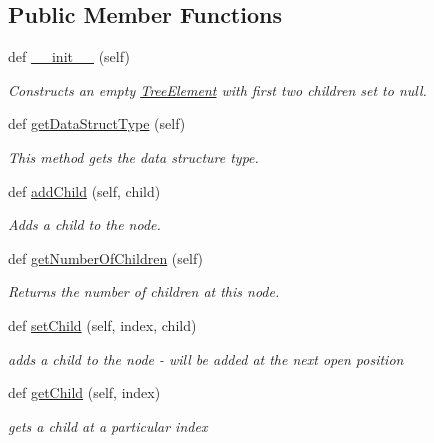 \subsection*{Public Member Functions}
\begin{DoxyCompactItemize}
\item 
def \hyperlink{class_tree_element_1_1_tree_element_ab58d73eaa251245c300b2ef98f6df82e}{\+\_\+\+\_\+init\+\_\+\+\_\+} (self)
\begin{DoxyCompactList}\small\item\em Constructs an empty \hyperlink{class_tree_element_1_1_tree_element}{Tree\+Element} with first two children set to null. \end{DoxyCompactList}\item 
def \hyperlink{class_tree_element_1_1_tree_element_a8df62ace8d1ba7131fe348a87bfd1d28}{get\+Data\+Struct\+Type} (self)
\begin{DoxyCompactList}\small\item\em This method gets the data structure type. \end{DoxyCompactList}\item 
def \hyperlink{class_tree_element_1_1_tree_element_ae5e92bcded51f4931c2f5c47d44ff26c}{add\+Child} (self, child)
\begin{DoxyCompactList}\small\item\em Adds a child to the node. \end{DoxyCompactList}\item 
def \hyperlink{class_tree_element_1_1_tree_element_a927788740a1a6ada175c22cf11d20e6b}{get\+Number\+Of\+Children} (self)
\begin{DoxyCompactList}\small\item\em Returns the number of children at this node. \end{DoxyCompactList}\item 
def \hyperlink{class_tree_element_1_1_tree_element_a76f31a2d5d1481c1c314024fbcd73ea0}{set\+Child} (self, index, child)
\begin{DoxyCompactList}\small\item\em adds a child to the node -\/ will be added at the next open position \end{DoxyCompactList}\item 
def \hyperlink{class_tree_element_1_1_tree_element_a5e1fc58ee2948c44f827969d3a817a38}{get\+Child} (self, index)
\begin{DoxyCompactList}\small\item\em gets a child at a particular index \end{DoxyCompactList}\item 

\end{DoxyCompactItemize}
